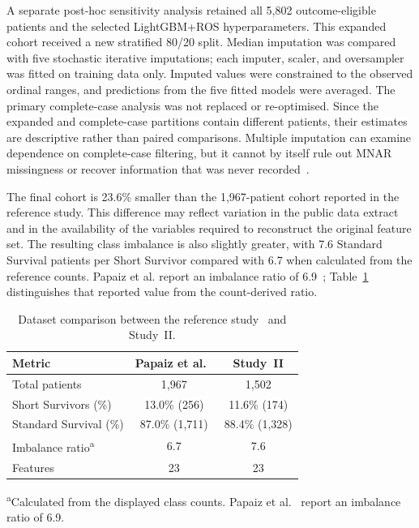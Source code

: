 A separate post-hoc sensitivity analysis retained all 5,802 outcome-eligible patients and the selected LightGBM+ROS hyperparameters. This expanded cohort received a new stratified 80/20 split. Median imputation was compared with five stochastic iterative imputations; each imputer, scaler, and oversampler was fitted on training data only. Imputed values were constrained to the observed ordinal ranges, and predictions from the five fitted models were averaged. The primary complete-case analysis was not replaced or re-optimised. Since the expanded and complete-case partitions contain different patients, their estimates are descriptive rather than paired comparisons. Multiple imputation can examine dependence on complete-case filtering, but it cannot by itself rule out \gls{MNAR} missingness or recover information that was never recorded~\cite{white2011mice,sterne2009multiple}.

The final cohort is 23.6\% smaller than the 1,967-patient cohort reported in the reference study. This difference may reflect variation in the public data extract and in the availability of the variables required to reconstruct the original feature set. The resulting class imbalance is also slightly greater, with 7.6 Standard Survival patients per Short Survivor compared with 6.7 when calculated from the reference counts. Papaiz et al. report an imbalance ratio of 6.9~\cite{Papaiz2024}; Table~\ref{tab:s2_dataset} distinguishes that reported value from the count-derived ratio.

\begin{table}[ht!]
  \centering
  \caption[Dataset comparison with Papaiz et al.]{Dataset comparison between the reference study~\protect\cite{Papaiz2024} and Study~II.}
  \label{tab:s2_dataset}
  \begin{tabular}{lcc}
    \toprule
    \textbf{Metric} & \textbf{Papaiz et al.\ \cite{Papaiz2024}} & \textbf{Study~II} \\
    \midrule
    Total patients         & 1,967          & 1,502          \\
    Short Survivors (\%)   & 13.0\% (256)   & 11.6\% (174)   \\
    Standard Survival (\%) & 87.0\% (1,711) & 88.4\% (1,328) \\
    Imbalance ratio\textsuperscript{a} & 6.7            & 7.6            \\
    Features               & 23             & 23             \\
    \bottomrule
  \end{tabular}
  \par\smallskip
  {\footnotesize \textsuperscript{a}Calculated from the displayed class counts. Papaiz et al.~\cite{Papaiz2024} report an imbalance ratio of 6.9.}
\end{table}

